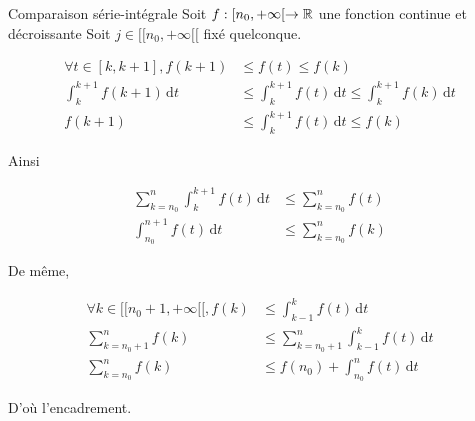\documentclass{article}
\begin{document}
\begin{question_kholle}{Comparaison série-intégrale}
    Soit $f:[n_{0}, +\infty[ \to \mathbb R$ une fonction continue et décroissante
    Soit $j \in [ \! [ n_{0}, +\infty [\![$ fixé quelconque.
    
    \begin{align*}
        \forall t \in [k, k+1], f(k+1) &\leqslant f(t) \leqslant f(k) \\
        \int_{k}^{k+1} f(k+1) \, \mathrm dt &\leqslant \int_{k}^{k+1} f(t) \, \mathrm dt \leqslant \int_{k}^{k+1}  f(k) \, \mathrm dt  \\
        f(k+1) & \leqslant \int_{k}^{k+1} f(t) \, \mathrm dt \leqslant f(k)
    \end{align*}
    
    Ainsi
    
    \begin{align*}
        \sum_{k=n_{0}}^{n}\int_{k}^{k+1}f(t)  \, \mathrm dt  & \leqslant \sum_{k=n_{0}}^{n}f(t) \\
        \int_{n_{0}}^{n+1} f(t) \, \mathrm dt & \leqslant \sum_{k=n_{0}}^{n}f(k)
    \end{align*}
    
    
    De même,
    
    \begin{align*}
        \forall k \in [ \! [ n_{0}+1 , +\infty[ \![, f(k) & \leqslant\int_{k-1}^{k} f(t) \, \mathrm dt  \\
        \sum_{k=n_{0}+1}^{n}f(k)  & \leqslant \sum_{k=n_{0}+1}^{n}\int_{k-1}^{k} f(t) \, \mathrm dt \\
        \sum_{k=n_{0}}^{n} f(k)&\leqslant f(n_{0})+ \int_{n_{0}}^{n} f(t) \, \mathrm dt 
    \end{align*}
    
    D'où l'encadrement.
\end{question_kholle}
\end{document}
